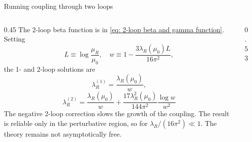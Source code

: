 \documentclass[aspectratio=169,10pt]{beamer}
\begin{document}
\begin{frame}{Running coupling through two loops}
    \begin{columns}[T,onlytextwidth]
    \begin{column}{0.45\textwidth}
    The 2-loop beta function is in \eqref{eq: 2-loop beta and gamma function}. Setting
    \begin{equation}
        L \equiv \log\frac{\mu_R}{\mu_0},\quad w \equiv 1 - \frac{3\lambda_R(\mu_0)L}{16\pi^2},
    \end{equation}
    the 1- and 2-loop solutions are
    \begin{equation}
        \lambda_R^{(1)} = \frac{\lambda_R(\mu_0)}{w},
    \end{equation}
    \begin{equation}
        \lambda_R^{(2)} = \frac{\lambda_R(\mu_0)}{w} + \frac{17\lambda_R^2(\mu_0)}{144\pi^2}\frac{\log w}{w^2}
    \end{equation}
    The negative 2-loop correction slows the growth of the coupling. The result is reliable only in the perturbative region, so for
    $\lambda_R/(16\pi^2) \ll 1$. The theory remains not asymptotically free.
    \end{column}

    \begin{column}{0.53\textwidth}
    \centering
    \end{column}
    \end{columns}
\end{frame}
\end{document}
